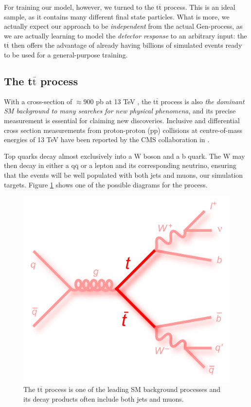 For training our model, however, we turned to the t$\overline{\text{t}}$ process. This is an ideal sample, as it contains many different final state particles. What is more, we actually expect our approach to be \emph{independent} from the actual Gen-process, as we are actually learning to model the \emph{detector response} to an arbitrary input: the t$\overline{\text{t}}$ then offers the advantage of already having billions of simulated events ready to be used for a general-purpose training.

\subsection{The t$\overline{\text{t}}$ process}
With a cross-section of $\approx 900$ pb at 13 TeV , the t$\overline{\text{t}}$ process is also \emph{the dominant SM background to many searches for new
physical phenomena}, and its precise measurement is essential for claiming new discoveries.
Inclusive and differential cross section measurements from
proton-proton (pp) collisions at centre-of-mass energies of 13 TeV have been reported by
the CMS collaboration in \cite{Sirunyan_2017}.


Top quarks decay almost exclusively into a W boson and a b quark. The W may then decay in either a q$\overline{\text{q}}$ or a lepton and its corresponding neutrino, ensuring that the events will be well populated with both jets and muons, our simulation targets. Figure \ref{fig:ttfig} shows one of the possible diagrams for the process.

\begin{figure}
    \centering
    \includegraphics[width=0.75\linewidth]{gfx/ch5/feynman_ttbar_ljets_longt.png}
    \caption[t$\overline{\text{t}}$ diagram]{ The t$\overline{\text{t}}$ process is one of the leading SM background processes and its decay products often include both jets and muons.}
    \label{fig:ttfig}
\end{figure}

